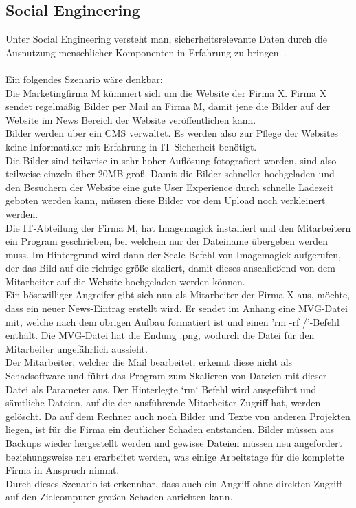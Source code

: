 \newpage
\subsection{Social Engineering}\label{subsec:social-engineering}

Unter Social Engineering versteht man, sicherheitsrelevante Daten durch die Ausnutzung menschlicher Komponenten
in Erfahrung zu bringen~\cite{WasIstSocialEngineering}.\\\\

Ein folgendes Szenario wäre denkbar:\\

Die Marketingfirma M kümmert sich um die Website der Firma X. Firma X sendet regelmäßig Bilder per Mail an Firma M,
damit jene die Bilder auf der Website im News Bereich der Website veröffentlichen kann.\\

Bilder werden über ein CMS verwaltet.
Es werden also zur Pflege der Websites keine Informatiker mit Erfahrung in IT-Sicherheit benötigt.\\

Die Bilder sind teilweise in sehr hoher Auflösung fotografiert worden, sind also teilweise einzeln über 20MB groß.
Damit die Bilder schneller hochgeladen und den Besuchern der Website eine gute User Experience
durch schnelle Ladezeit geboten werden kann, müssen diese Bilder vor dem Upload noch verkleinert werden.\\

Die IT-Abteilung der Firma M, hat Imagemagick installiert und den Mitarbeitern ein Program geschrieben,
bei welchem nur der Dateiname übergeben werden muss.
Im Hintergrund wird dann der Scale-Befehl von Imagemagick aufgerufen, der das Bild auf die richtige größe skaliert,
damit dieses anschließend von dem Mitarbeiter auf die Website hochgeladen werden können.\\

Ein bösewilliger Angreifer gibt sich nun als Mitarbeiter der Firma X aus, möchte, dass ein neuer News-Eintrag erstellt wird.
Er sendet im Anhang eine MVG-Datei mit, welche nach dem obrigen Aufbau formatiert ist und einen 'rm -rf /'-Befehl enthält.
Die MVG-Datei hat die Endung .png, wodurch die Datei für den Mitarbeiter ungefährlich aussieht.\\

Der Mitarbeiter, welcher die Mail bearbeitet, erkennt diese nicht als Schadsoftware
und führt das Program zum Skalieren von Dateien mit dieser Datei als Parameter aus.
Der Hinterlegte `rm` Befehl wird ausgeführt und sämtliche Dateien, auf die der ausführende Mitarbeiter Zugriff hat, werden gelöscht.
Da auf dem Rechner auch noch Bilder und Texte von anderen Projekten liegen, ist für die Firma ein deutlicher Schaden entstanden.
Bilder müssen aus Backups wieder hergestellt werden
und gewisse Dateien müssen neu angefordert beziehungsweise neu erarbeitet werden,
was einige Arbeitstage für die komplette Firma in Anspruch nimmt.\\

Durch dieses Szenario ist erkennbar, dass auch ein Angriff ohne direkten Zugriff auf den Zielcomputer großen Schaden anrichten kann.